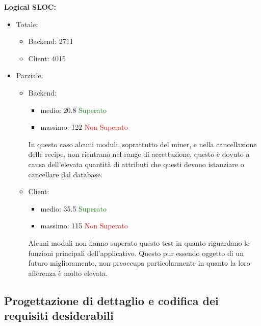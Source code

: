 \begin{description}
				\item \textbf{Logical SLOC:}\\
					\begin{itemize}	
						\item Totale:
							\begin{itemize}
								\item Backend: 2711
								\item Client: 4015
							\end{itemize}
						\item Parziale:
							\begin{itemize}		
								\item Backend:
									\begin{itemize}
										\item medio: 20.8 \textcolor{green}{Superato}
										\item massimo: 122 \textcolor{red}{Non Superato}
									\end{itemize}
					In questo caso alcuni moduli, soprattutto del miner, e nella cancellazione delle recipe, non rientrano nel range di accettazione, questo è dovuto a causa dell’elevata quantità di attributi che questi devono istanziare o cancellare dal database.			
					\item Client:
						\begin{itemize}
							\item medio: 35.5 \textcolor{green}{Superato}
							\item massimo: 115 \textcolor{red}{Non Superato}
						\end{itemize}
					Alcuni moduli non hanno superato questo test in quanto riguardano le funzioni principali dell'applicativo. Questo pur essendo oggetto di un futuro miglioramento, non preoccupa particolarmente in quanto la loro afferenza è molto elevata.
					\end{itemize}
					\end{itemize}
			\end{description}
					
	\subsection{Progettazione di dettaglio e codifica dei requisiti desiderabili}
	\label{sub:progettazione_di_dettaglio_e_codifica_requisiti_desiderabili}
